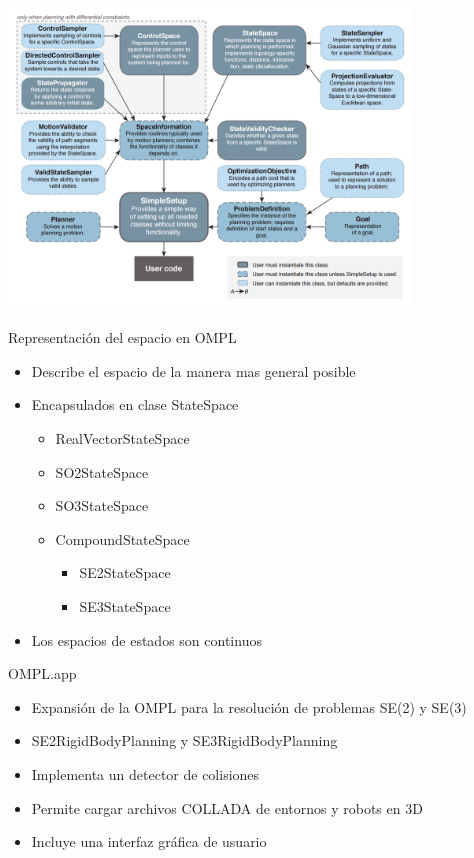 \documentclass[10pt]{beamer}
\begin{document}
\begin{frame}
 \vspace{1.3cm}
	\begin{center}	
		\includegraphics[width=0.8\textwidth,height=0.8\textheight,keepaspectratio]{OMPL1}	
	\end{center}
\end{frame}

\begin{frame}{Representación del espacio en OMPL}
	\begin{itemize}
		\item Describe el espacio de la manera mas general posible
		
		\item Encapsulados en clase StateSpace
			\begin{itemize}
				
				\item RealVectorStateSpace
				\item SO2StateSpace
				\item SO3StateSpace
				\item CompoundStateSpace
				\begin{itemize}
					\item SE2StateSpace
					\item SE3StateSpace
				\end{itemize}
			\end{itemize}
		\item Los espacios de estados son continuos
	\end{itemize}
\end{frame}

\begin{frame}{OMPL.app}
	\begin{itemize}
		\item Expansión de la OMPL para la resolución de problemas SE(2) y SE(3)
		\item SE2RigidBodyPlanning y SE3RigidBodyPlanning
		\item Implementa un detector de colisiones
		\item Permite cargar archivos COLLADA de entornos y robots en 3D
		\item Incluye una interfaz gráfica de usuario	
		
	\end{itemize}
\end{frame}
\end{document}
